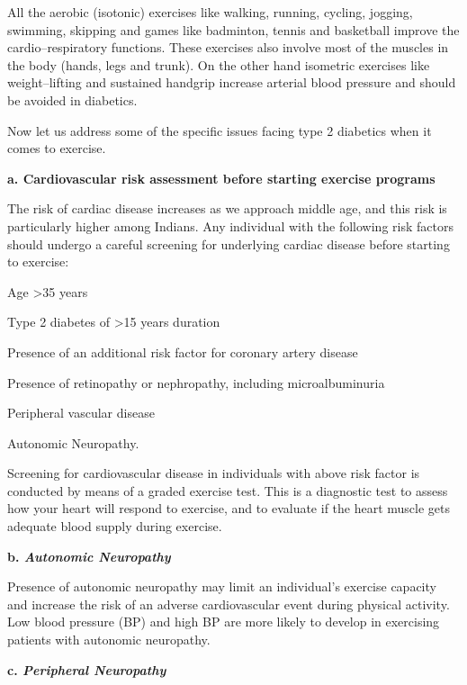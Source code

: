 All the aerobic (isotonic) exercises like walking, running, cycling, jogging, swimming, skipping and games like badminton, tennis and basketball improve the cardio–respiratory functions. These exercises also involve most of the muscles in the body (hands, legs and trunk). On the other hand isometric exercises like weight–lifting and sustained handgrip increase arterial blood pressure and should be avoided in diabetics.

Now let us address some of the specific issues facing type 2 diabetics when it comes to exercise.

\textbf{a. Cardiovascular risk assessment before starting exercise programs}

The risk of cardiac disease increases as we approach middle age, and this risk is particularly higher among Indians. Any individual with the following risk factors should undergo a careful screening for underlying cardiac disease before starting to exercise:

\item Age \textgreater  35 years

 \item Type 2 diabetes of \textgreater  15 years duration

 \item Presence of an additional risk factor for coronary artery disease

 \item Presence of retinopathy or nephropathy, including microalbuminuria

 \item Peripheral vascular disease

 \item Autonomic Neuropathy.

Screening for cardiovascular disease in individuals with above risk factor is conducted by means of a graded exercise test. This is a diagnostic test to assess how your heart will respond to exercise, and to evaluate if the heart muscle gets adequate blood supply during exercise.

\textbf{b. \textit{Autonomic Neuropathy}}

Presence of autonomic neuropathy may limit an individual’s exercise capacity and increase the risk of an adverse cardiovascular event during physical activity. Low blood pressure (BP) and high BP are more likely to develop in exercising patients with autonomic neuropathy.

\textbf{c. \textit{Peripheral Neuropathy}}

